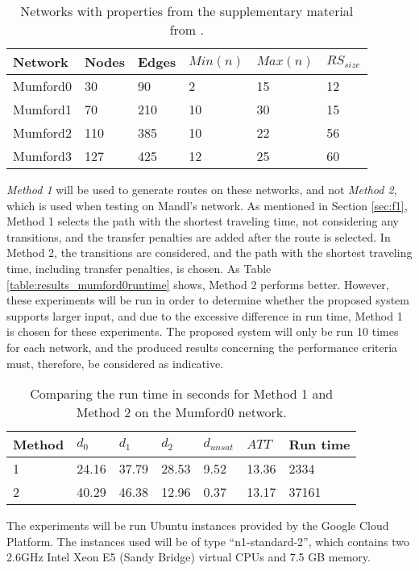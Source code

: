 \begin{table}[H]
	\centering
	\begin{tabular}{|l|l|l|l|l|l|}
    	\hline
    	\textbf{Network} & \textbf{Nodes}&\textbf{Edges} & $Min(n)$ & $Max(n)$ & $RS_{size}$\\
    	\hline
   	    Mumford0 & 30&90 & 2&15 & 12 \\
   	    Mumford1 & 70&210 & 10&30 & 15 \\
   	    Mumford2 & 110&385 & 10&22 & 56 \\
   	    Mumford3 & 127&425 & 12&25 & 60 \\
   	    \hline
    \end{tabular}
    \caption{Networks with properties from the supplementary material from \citet{mumford13}.}
    \label{table:dataSet_mumford}
\end{table}

\textit{Method 1} will be used to generate routes on these networks, and not \textit{Method 2}, which is used when testing on Mandl's network. As mentioned in Section \vref{sec:f1}, Method 1 selects the path with the shortest traveling time, not considering any transitions, and the transfer penalties are added after the route is selected. In Method 2, the transitions are considered, and the path with the shortest traveling time, including transfer penalties, is chosen. As Table \vref{table:results_mumford0runtime} shows, Method 2 performs better. However, these experiments will be run in order to determine whether the proposed system supports larger input, and due to the excessive difference in run time, Method 1 is chosen for these experiments. The proposed system will only be run 10 times for each network, and the produced results concerning the performance criteria must, therefore, be considered as indicative. 

\begin{table}[H]
    \centering
    \begin{tabular}{|l|l|l|l|l|l|l|}
        \hline
        \textbf{Method} & $d_0$ & $d_1$ & $d_2$ & $d_{unsat}$ & $ATT$ & \textbf{Run time} \\
        \hline
        1 & 24.16 & 37.79 & 28.53 & 9.52 & 13.36 & 2334 \\
        2 & 40.29 & 46.38 & 12.96 & 0.37 & 13.17 & 37161 \\
        \hline
    \end{tabular}
    \caption{Comparing the run time in seconds for Method 1 and Method 2 on the Mumford0 network.}
    \label{table:results_mumford0runtime}
\end{table}

The experiments will be run Ubuntu instances provided by the Google Cloud Platform\citep{website:google}. The instances used will be of type ``n1-standard-2'', which contains two 2.6GHz Intel Xeon E5 (Sandy Bridge) virtual CPUs and 7.5 GB memory.
